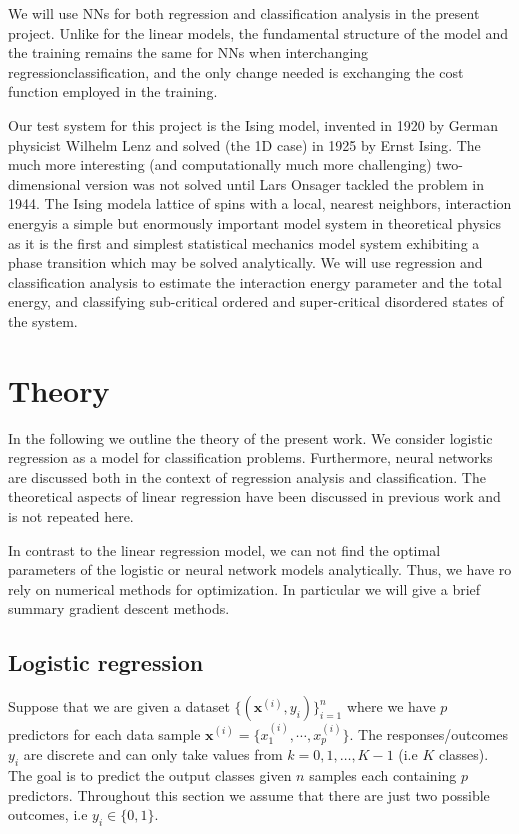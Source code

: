\documentclass[a4paper, twocolumn]{article}
\begin{document}
We will use NNs for both regression and classification analysis in the present project. Unlike for the linear models, the fundamental structure of the model and the training remains the same for NNs when interchanging regression\ce{<=>}classification, and the only change needed is exchanging the cost function employed in the training. 

Our test system for this project is the Ising model, invented in 1920 by German physicist Wilhelm Lenz and solved (the 1D case) in 1925 by Ernst Ising\autocite{Ising1925}. The much more interesting (and computationally much more challenging) two-dimensional version was not solved until Lars Onsager tackled the problem in 1944\autocite{onsager1944crystal}. The Ising model\textemdash a lattice of spins with a local, nearest neighbors, interaction energy\textemdash is a simple but enormously important model system in theoretical physics as it is the first and simplest statistical mechanics model system exhibiting a phase transition which may be solved analytically\autocite{mccoy2012importance}. We will use regression and classification analysis to estimate the interaction energy parameter and the total energy, and classifying sub-critical ordered and super-critical disordered states of the system.

\section{Theory}
In the following we outline the theory of the present work. We 
consider logistic regression as a model for classification problems. Furthermore, neural networks are discussed 
both in the context of regression analysis and classification. The theoretical aspects of linear regression have been 
discussed in previous work and is not repeated here.

In contrast to the linear regression model, we can not find the optimal parameters of the logistic or neural network 
models analytically. Thus, we have ro rely on numerical methods for optimization. In particular we will give a brief summary
gradient descent methods.

\subsection{Logistic regression}
Suppose that we are given a dataset $\{ (\mathbf{x}^{(i)}, y_i) \}_{i=1}^n $ where we have $p$ predictors 
for each data sample $\mathbf{x}^{(i)} = \{ x_1^{(i)}, \cdots, x_p^{(i)} \}$. The responses/outcomes $y_i$ are discrete and can 
only take values from $k=0,1,\dots,K-1$ (i.e $K$ classes). The goal is to predict the output classes given $n$ samples each containing 
$p$ predictors. Throughout this section we assume that there are just two possible outcomes, i.e $y_i \in \{0,1\}$.
\end{document}
